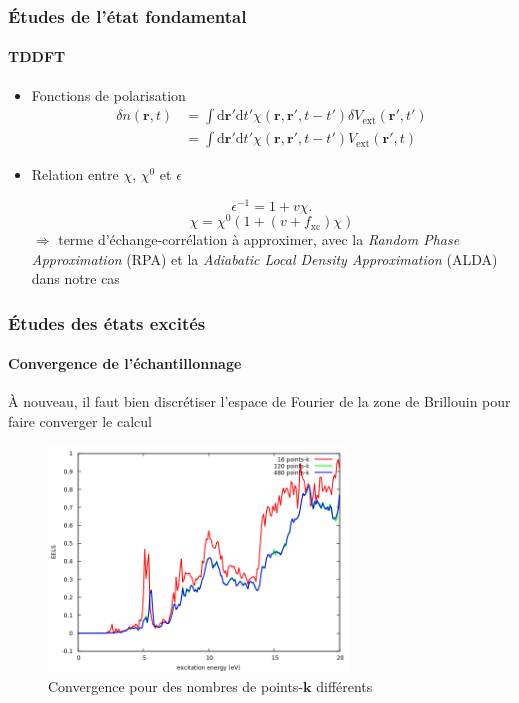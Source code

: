 \documentclass[a4paper, 12pt, twoside, titlepage, french]{beamer}
\newcommand{\vb}[1]{\textbf{#1}}
\newcommand{\V}[1]{\textrm{#1}}
\newcommand{\dd}[0]{\textrm{d}}
\begin{document}
\begin{frame}
\frametitle{Études de l'état fondamental}
\framesubtitle{TDDFT}
\begin{itemize}
\item Fonctions de polarisation
\begin{equation*}
\begin{split}
\delta n(\vb{r}, t) &= \int \dd{\vb{r}'} \dd{t'} \chi(\vb{r}, \vb{r}', t-t')\delta V_{\V{ext}}(\vb{r}', t')\\
 &= \int \dd {\vb{r}'} \dd{t'} \chi(\vb{r}, \vb{r}', t-t') V_{\V{ext}}(\vb{r}', t)
\end{split}
\end{equation*}
\item Relation entre $\chi$, $\chi^0$ et $\epsilon$

\begin{equation*}
  \epsilon^{-1} = 1+ v\chi.
\end{equation*} 
\begin{equation*}
\chi = \chi^0 ( 1 + (v+f_{\textrm{xc}})\chi)
\end{equation*}
$\Longrightarrow$ terme d'échange-corrélation à approximer,  avec la \textit{Random Phase Approximation} (RPA) et la \textit{Adiabatic Local Density Approximation} (ALDA) dans notre cas
\end{itemize}
 
\end{frame}
\newpage
\begin{frame}
\frametitle{Études des états excités}
\framesubtitle{Convergence de l'échantillonnage}
À nouveau, il faut bien discrétiser l'espace de Fourier de la zone de Brillouin pour faire converger le calcul
\begin{figure}[!h]
    \centering
    \includegraphics[width=8cm]{kpt_compare}
    \caption{Convergence pour des nombres de points-$\vb{k}$ différents}
\end{figure}

\end{frame}
\end{document}
